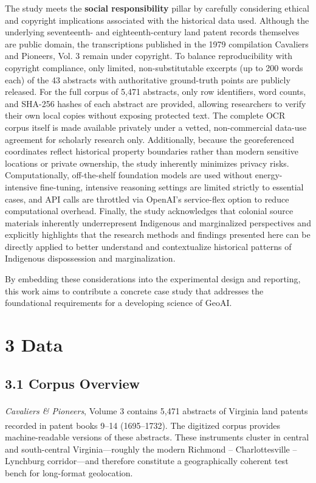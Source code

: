 \documentclass[
  10pt,
  twocolumn]{article}
\begin{document}
The study meets the \textbf{social responsibility} pillar by carefully
considering ethical and copyright implications associated with the
historical data used. Although the underlying seventeenth- and
eighteenth-century land patent records themselves are public domain, the
transcriptions published in the 1979 compilation Cavaliers and Pioneers,
Vol. 3 remain under copyright. To balance reproducibility with copyright
compliance, only limited, non-substitutable excerpts (up to 200 words
each) of the 43 abstracts with authoritative ground-truth points are
publicly released. For the full corpus of 5,471 abstracts, only row
identifiers, word counts, and SHA-256 hashes of each abstract are
provided, allowing researchers to verify their own local copies without
exposing protected text. The complete OCR corpus itself is made
available privately under a vetted, non-commercial data-use agreement
for scholarly research only. Additionally, because the georeferenced
coordinates reflect historical property boundaries rather than modern
sensitive locations or private ownership, the study inherently minimizes
privacy risks. Computationally, off-the-shelf foundation models are used
without energy-intensive fine-tuning, intensive reasoning settings are
limited strictly to essential cases, and API calls are throttled via
OpenAI's service-flex option to reduce computational overhead. Finally,
the study acknowledges that colonial source materials inherently
underrepresent Indigenous and marginalized perspectives and explicitly
highlights that the research methods and findings presented here can be
directly applied to better understand and contextualize historical
patterns of Indigenous dispossession and marginalization.

By embedding these considerations into the experimental design and
reporting, this work aims to contribute a concrete case study that
addresses the foundational requirements for a developing science of
GeoAI.

\section{3 Data}\label{data}

\subsection{3.1 Corpus Overview}\label{corpus-overview}

\emph{Cavaliers \& Pioneers}, Volume
3\textsuperscript{} contains
5,471 abstracts of Virginia land patents recorded in patent books 9--14
(1695--1732). The digitized
corpus\textsuperscript{} provides
machine-readable versions of these abstracts. These instruments cluster
in central and south-central Virginia---roughly the modern Richmond --
Charlottesville -- Lynchburg corridor---and therefore constitute a
geographically coherent test bench for long-format geolocation.
\end{document}
